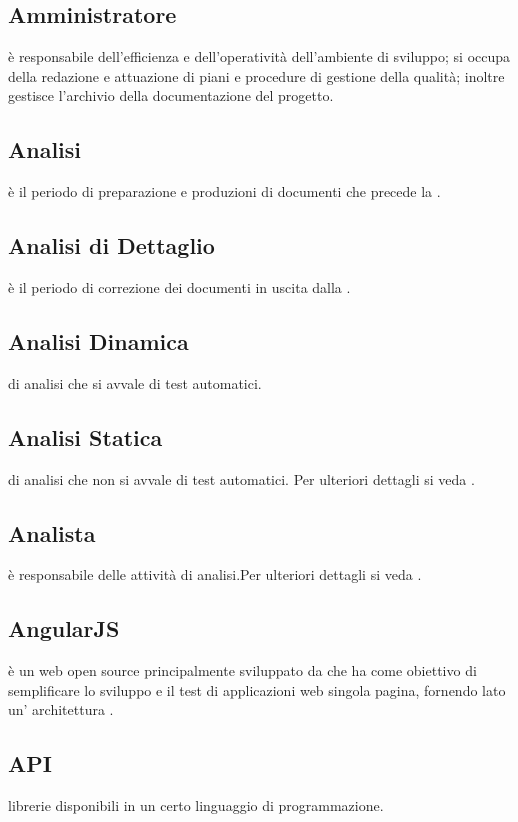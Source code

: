 \documentclass[12pt,a4paper]{article}
\begin{document}
\subsection{Amministratore} 
è responsabile dell'efficienza e dell'operatività dell'ambiente di sviluppo; si occupa della redazione e attuazione di piani e procedure di gestione della qualità; inoltre gestisce l'archivio della documentazione del progetto.

\subsection{Analisi}
è il periodo di preparazione e produzioni di documenti che precede la \RR.

\subsection{Analisi di Dettaglio}
è il periodo di correzione dei documenti in uscita dalla \RR.

\subsection{Analisi Dinamica}
  di analisi che si avvale di test automatici.

\subsection{Analisi Statica}
  di analisi che non si avvale di test automatici. Per ulteriori dettagli si veda \PdQ{}.

\subsection{Analista}
è responsabile delle attività di analisi.Per ulteriori dettagli si veda \PdQ{}.

\subsection{AngularJS}
è un  web open source principalmente sviluppato da  che ha come obiettivo di semplificare lo sviluppo e il test di applicazioni web singola pagina, fornendo lato  un' architettura .

\subsection{API}
librerie  disponibili in un certo linguaggio di programmazione.
\end{document}
